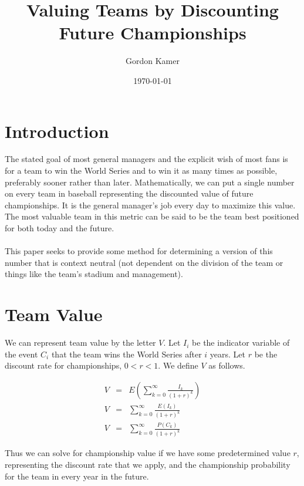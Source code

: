 \documentclass[11pt]{article}
\begin{document}
\twocolumn

\setlength{\columnsep}{25pt}

\title{Valuing Teams by Discounting Future Championships}
\author{Gordon Kamer}
\date{\today}
\maketitle

\section{Introduction}

The stated goal of most general managers and the explicit wish of most fans is for a team to win the World Series and to win it as many times as possible, preferably sooner rather than later. Mathematically, we can put a single number on every team in baseball representing the discounted value of future championships. It is the general manager's job every day to maximize this value. The most valuable team in this metric can be said to be the team best positioned for both today and the future.\\\\
This paper seeks to provide some method for determining a version of this number that is context neutral (not dependent on the division of the team or things like the team's stadium and management).

\section{Team Value}

We can represent team value by the letter $V$. Let $I_i$ be the indicator variable of the event $C_i$ that the team wins the World Series after $i$ years. Let $r$ be the discount rate for championships, $0 < r < 1$. We define $V$ as follows.

\begin{eqnarray*}
V &=& E\left(\sum_{k=0}^{\infty}\frac{I_k}{(1 + r)^k}\right)\\
V &=& \sum_{k=0}^{\infty}\frac{E(I_k)}{(1 + r)^k}\\
V &=& \sum_{k=0}^{\infty}\frac{P(C_k)}{(1 + r)^k}
\end{eqnarray*}

Thus we can solve for championship value if we have some predetermined value $r$, representing the discount rate that we apply, and the championship probability for the team in every year in the future.
\end{document}
